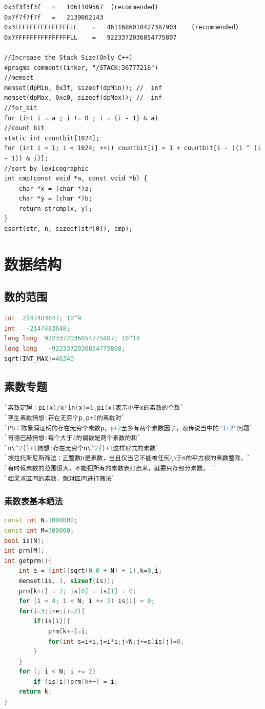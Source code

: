 \documentclass[a4paper]{article}
\begin{document}
\begin{CJK*}{UTF8}{gbsn}
\begin{multicols}{3}
\begin{flushleft}
\begin{lstlisting}
0x3f3f3f3f   =   1061109567  (recommended)
0x7f7f7f7f   =   2139062143
0x3FFFFFFFFFFFFFFFLL    =   4611686018427387903    (recommended)
0x7FFFFFFFFFFFFFFFLL    =   9223372036854775807

//Increase the Stack Size(Only C++)
#pragma comment(linker, "/STACK:36777216")
//memset
memset(dpMin, 0x3f, sizeof(dpMin)); //  inf
memset(dpMax, 0xc0, sizeof(dpMax)); // -inf
//for_bit
for (int i = a ; i != 0 ; i = (i - 1) & a)
//count bit
static int countbit[1024];
for (int i = 1; i < 1024; ++i) countbit[i] = 1 + countbit[i - ((i ^ (i - 1)) & i)];
//sort by lexicographic
int cmp(const void *a, const void *b) {
	char *x = (char *)a;
	char *y = (char *)b;
	return strcmp(x, y);
}
qsort(str, n, sizeof(str[0]), cmp);
\end{lstlisting}


\section{数据结构}

\subsection{数的范围}
\begin{lstlisting}[language={c++}]
int  2147483647; 10^9
int   -2147483648;
long long  9223372036854775807; 10^18
long long   -9223372036854775808;
sqrt(INT_MAX)=46340
\end{lstlisting}

\subsection{素数专题}
\begin{lstlisting}[language={c++}]
`素数定理：pi(x)/x*ln(x)=1,pi(x)表示小于x的素数的个数`
`孪生素数猜想:存在无穷个p,p+2的素数对`
`PS：陈景润证明的存在无穷个素数p，p+2至多有两个素数因子，及传说当中的"1+2"问题`
`哥德巴赫猜想:每个大于2的偶数是两个素数的和`
`n\^2{}+1猜想:存在无穷个n\^2{}+1这样形式的素数`
`埃拉托斯尼斯筛法：正整数n是素数，当且仅当它不能被任何小于n的平方根的素数整除。`
`有时候素数的范围很大，不能把所有的素数表打出来，就要只存部分素数。 `
`如果求区间的素数，就对区间进行筛法`
\end{lstlisting}


\subsubsection{素数表基本晒法}
\begin{lstlisting}[language={c++}]
const int N=1000000;
const int M=300000;
bool is[N]; 
int prm[M];
int getprm(){
	int e = (int)(sqrt(0.0 + N) + 1),k=0,i;
	memset(is, 1, sizeof(is));
	prm[k++] = 2; is[0] = is[1] = 0;
	for (i = 4; i < N; i += 2) is[i] = 0;
	for(i=3;i<e;i+=2){
		if(is[i]){
			prm[k++]=i;
			for(int s=i+i,j=i*i;j<N;j+=s)is[j]=0;
		}
	}
	for (; i < N; i += 2)
		if (is[i])prm[k++] = i;
	return k; 
}
\end{lstlisting}


\end{flushleft}
\end{multicols}
\end{CJK*}
\end{document}
